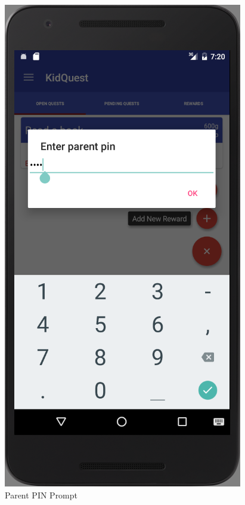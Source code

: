 \begin{figure}[ht] 
  \begin{minipage}[b]{0.45\linewidth}
    \centering
    \includegraphics[width=.7\linewidth, frame]{../images/Screenshot/ParentPinPrompt.png} 
    \caption{Parent PIN Prompt} 
    \vspace{4ex}
  \end{minipage}%
  \begin{minipage}[b]{0.45\linewidth}
    \centering

\end{minipage}
\end{figure}
